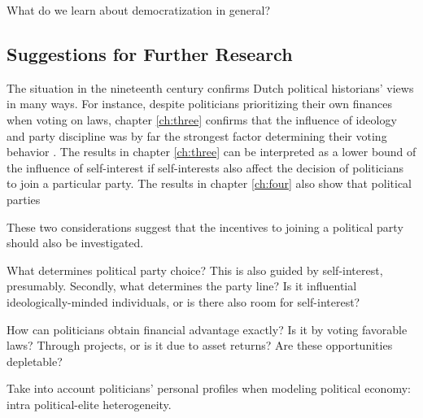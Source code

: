 What do we learn about democratization in general?


\subsection{Suggestions for Further Research}\label{sec:sfr}

The situation in the nineteenth century confirms Dutch political historians' views in many ways. For instance, despite politicians prioritizing their own finances when voting on laws, chapter \ref{ch:three} confirms that the influence of ideology and party discipline was by far the strongest factor determining their voting behavior \citep[see e.g.][]{de2003het, de2014ons}. The results in chapter \ref{ch:three} can be interpreted as a lower bound of the influence of self-interest if self-interests also affect the decision of politicians to join a particular party.  The results in chapter \ref{ch:four} also show that political parties 

These two considerations suggest that the incentives to joining a political party should also be investigated.









What determines political party choice? This is also guided by self-interest, presumably. Secondly, what determines the party line? Is it influential ideologically-minded individuals, or is there also room for self-interest?


How can politicians obtain financial advantage exactly? Is it by voting favorable laws? Through projects, or is it due to asset returns? Are these opportunities depletable?


Take into account politicians' personal profiles when modeling political economy: intra political-elite heterogeneity.





